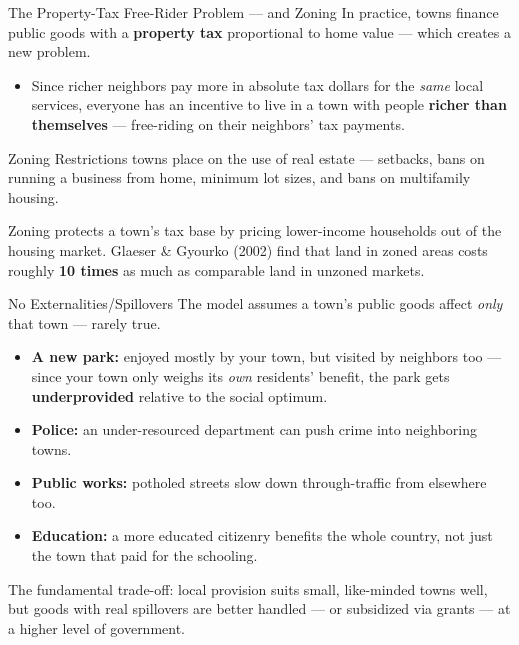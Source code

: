 \documentclass[11pt,aspectratio=169]{beamer}
\begin{document}
\begin{frame}{The Property-Tax Free-Rider Problem --- and Zoning}
  In practice, towns finance public goods with a \textbf{property tax} proportional to home value --- which creates a new problem.
  \begin{itemize}
    \item Since richer neighbors pay more in absolute tax dollars for the \emph{same} local services, everyone has an incentive to live in a town with people \textbf{richer than themselves} --- free-riding on their neighbors' tax payments.
  \end{itemize}
  \begin{block}{Zoning}
    Restrictions towns place on the use of real estate --- setbacks, bans on running a business from home, minimum lot sizes, and bans on multifamily housing.
  \end{block}
  \small Zoning protects a town's tax base by pricing lower-income households out of the housing market. Glaeser \& Gyourko (2002) find that land in zoned areas costs roughly \textbf{10 times} as much as comparable land in unzoned markets.
\end{frame}

\begin{frame}{No Externalities/Spillovers}
  The model assumes a town's public goods affect \emph{only} that town --- rarely true.
  \begin{itemize}
    \item \textbf{A new park:} enjoyed mostly by your town, but visited by neighbors too --- since your town only weighs its \emph{own} residents' benefit, the park gets \textbf{underprovided} relative to the social optimum.
    \item \textbf{Police:} an under-resourced department can push crime into neighboring towns.
    \item \textbf{Public works:} potholed streets slow down through-traffic from elsewhere too.
    \item \textbf{Education:} a more educated citizenry benefits the whole country, not just the town that paid for the schooling.
  \end{itemize}
  \small The fundamental trade-off: local provision suits small, like-minded towns well, but goods with real spillovers are better handled --- or subsidized via grants --- at a higher level of government.
\end{frame}
\end{document}
